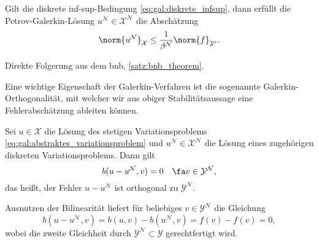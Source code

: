 \begin{Satz}
    \label{satz:gal:stabilitaet}
    Gilt die diskrete inf-sup-Bedingung \cref{eq:gal:diskrete_infsup}, dann erfüllt die Petrov-Galerkin-Lösung $u^{\mathcal N} \in \mathcal X^{\mathcal N}$ die Abschätzung
    \begin{equation}
        \label{eq:gal:statibilitaet}
        \norm{u^{\mathcal N}}_{\mathcal X} \leq \frac{1}{\beta^{\mathcal N}} \norm{f}_{\mathcal Y'}.
    \end{equation}

    \begin{Beweis}
        Direkte Folgerung aus dem \ac{bnb}, \cref{satz:bnb_theorem}.
    \end{Beweis}
\end{Satz}

Eine wichtige Eigenschaft der Galerkin-Verfahren ist die sogenannte Galerkin-Orthogonalität, mit welcher wir aus obiger Stabilitätsaussage eine Fehlerabschätzung ableiten können.

\begin{Lemma}
    \label{lemma:gal:galerkin_ortho}
    Sei $u \in \mathcal X$ die Lösung des stetigen Variationsproblems \cref{eq:gal:abstraktes_variationsproblem} und $u^{\mathcal N} \in \mathcal X^{\mathcal N}$ die Lösung eines zugehörigen diskreten Variationsproblems.
    Dann gilt
    \begin{equation}
        \label{eq:gal:galerkin_ortho}
        b(u - u^{\mathcal N}, v) = 0 \quad \fa v \in \mathcal Y^{\mathcal N},
    \end{equation}
    das heißt, der Fehler $u - u^{\mathcal N}$ ist orthogonal zu $\mathcal Y^{\mathcal N}$.

    \begin{Beweis}
        Ausnutzen der Bilinearität liefert für beliebiges $v \in \mathcal Y^{\mathcal N}$ die Gleichung
        \begin{equation}
            b(u - u^{\mathcal N}, v) = b(u, v) - b(u^{\mathcal N}, v) = f(v) - f(v) = 0,
        \end{equation}
        wobei die zweite Gleichheit durch $\mathcal Y^{\mathcal N} \subset \mathcal Y$ gerechtfertigt wird.
    \end{Beweis}
\end{Lemma}

